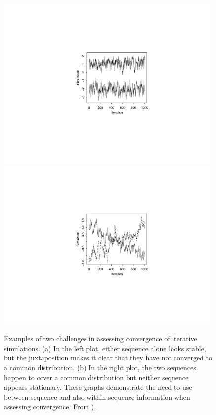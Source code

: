 \documentclass[american,]{article}
\theoremstyle{definition}
\begin{document}
\begin{figure}
\vspace{-.22\textwidth}
\centerline{\hspace{-.1\textwidth}
\includegraphics[width=0.98\textwidth]{graphics/convergechallenge1.pdf}
\hspace{-.5\textwidth}
\includegraphics[width=0.98\textwidth]{graphics/convergechallenge2.pdf}}
\vspace{-.22\textwidth}
\caption{ Examples of two challenges in assessing convergence of iterative
simulations. (a) In the left plot, either sequence alone looks stable, but the
juxtaposition makes it clear that they have not converged to a common
distribution. (b) In the right plot, the two sequences happen to cover a common
distribution but neither sequence appears stationary. These graphs demonstrate
the need to use between-sequence and also within-sequence information when
assessing convergence. From \citet{BDA3}).}
\label{converge.challenge}
\end{figure}
\end{document}
